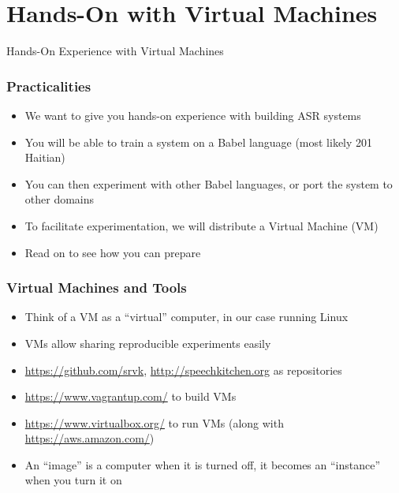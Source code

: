 \section{Hands-On with Virtual Machines}

\begin{frame}
  \begin{center}
    {\color{Maroon}\Huge Hands-On Experience with Virtual Machines\par}
  \end{center}
\end{frame}

\begin{frame}
  \frametitle{Practicalities}
  \begin{itemize}
  \item We want to give you hands-on experience with building ASR systems
  \item You will be able to train a system on a Babel language (most likely 201 Haitian)
  \item You can then experiment with other Babel languages, or port the system to other domains
  \item To facilitate experimentation, we will distribute a Virtual Machine (VM)
  \item {\color{Maroon}Read on to see how you can prepare}
  \end{itemize}
\end{frame}

\begin{frame}
  \frametitle{Virtual Machines and Tools}
  \begin{itemize}
  \item Think of a VM as a ``virtual'' computer, in our case running Linux
  \item VMs allow sharing reproducible experiments easily
  \item \url{https://github.com/srvk}, \url{http://speechkitchen.org} as repositories
  \item \url{https://www.vagrantup.com/} to build VMs
  \item \url{https://www.virtualbox.org/} to run VMs (along with \url{https://aws.amazon.com/})
  \item An ``image'' is a computer when it is turned off, it becomes an ``instance'' when you turn it on
  \end{itemize}
\end{frame}

